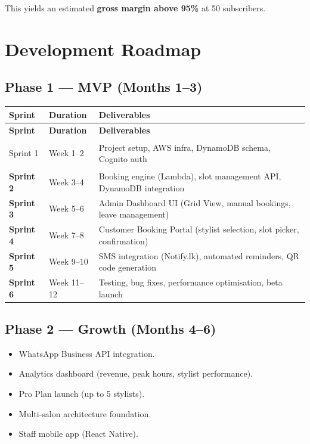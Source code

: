 \documentclass[12pt,a4paper]{report}
\begin{document}
This yields an estimated \textbf{gross margin above 95\%} at 50 subscribers.

\chapter{Development Roadmap}

\section{Phase 1 — MVP (Months 1–3)}

\begin{longtable}{>{\bfseries}p{3cm} p{4cm} p{7cm}}
  \toprule
  \textbf{Sprint} & \textbf{Duration} & \textbf{Deliverables} \\
  \midrule
  \endfirsthead
  \toprule
  \textbf{Sprint} & \textbf{Duration} & \textbf{Deliverables} \\
  \midrule
  \endhead
  \bottomrule
  \endfoot

  Sprint 1 & Week 1–2 & Project setup, AWS infra, DynamoDB schema, Cognito auth \\[4pt]
  Sprint 2 & Week 3–4 & Booking engine (Lambda), slot management API, DynamoDB integration \\[4pt]
  Sprint 3 & Week 5–6 & Admin Dashboard UI (Grid View, manual bookings, leave management) \\[4pt]
  Sprint 4 & Week 7–8 & Customer Booking Portal (stylist selection, slot picker, confirmation) \\[4pt]
  Sprint 5 & Week 9–10 & SMS integration (Notify.lk), automated reminders, QR code generation \\[4pt]
  Sprint 6 & Week 11–12 & Testing, bug fixes, performance optimisation, beta launch \\
\end{longtable}

\section{Phase 2 — Growth (Months 4–6)}

\begin{itemize}[leftmargin=2em]
  \item WhatsApp Business API integration.
  \item Analytics dashboard (revenue, peak hours, stylist performance).
  \item Pro Plan launch (up to 5 stylists).
  \item Multi-salon architecture foundation.
  \item Staff mobile app (React Native).
\end{itemize}
\end{document}

